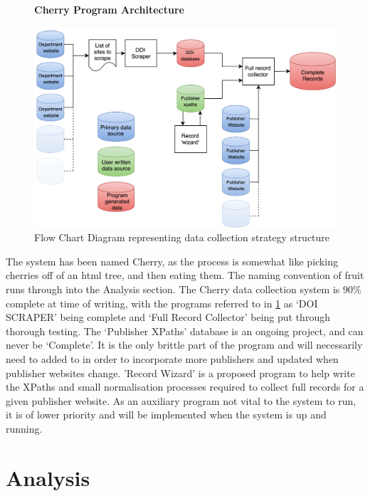 \documentclass[11pt, oneside]{article}   	%
\begin{document}
\begin{figure}[H]
    \centering
    \textbf{Cherry Program Architecture}\par\medskip
    \includegraphics[scale=0.15]{CHERRY.png}
    \caption{Flow Chart Diagram representing data collection strategy structure \label{fig:CHERRY}}
\end{figure}
The system has been named Cherry, as the process is somewhat like picking cherries off of an html tree, and then eating them. The naming convention of fruit runs through into the Analysis section. 
The Cherry data collection system is 90\% complete at time of writing, with the programs referred to in \ref{fig:CHERRY} as `DOI SCRAPER' being complete and `Full Record Collector' being put through thorough testing. The `Publisher XPaths' database is an ongoing project, and can never be `Complete'. It is the only brittle part of the program and will necessarily need to added to in order to incorporate more publishers and updated when publisher websites change. 
'Record Wizard' is a proposed program to help write the XPaths and small normalisation processes required to collect full records for a given publisher website. As an auxiliary program not vital to the system to run, it is of lower priority and will be implemented when the system is up and running.
\section{Analysis}
\label{sec:ANALYSIS}
\end{document}
